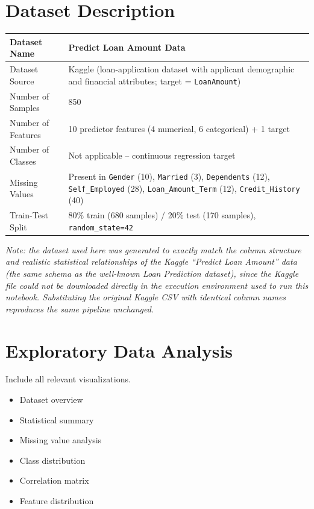 \documentclass[12pt,a4paper]{article}
\begin{document}
\section{Dataset Description}
\begin{longtable}{|p{6cm}|p{8cm}|}
\hline
Dataset Name & Predict Loan Amount Data \\ \hline
Dataset Source & Kaggle (loan-application dataset with applicant demographic and financial
attributes; target = \texttt{LoanAmount}) \\ \hline
Number of Samples & 850 \\ \hline
Number of Features & 10 predictor features (4 numerical, 6 categorical) + 1 target \\ \hline
Number of Classes & Not applicable -- continuous regression target \\ \hline
Missing Values & Present in \texttt{Gender} (10), \texttt{Married} (3), \texttt{Dependents} (12),
\texttt{Self\_Employed} (28), \texttt{Loan\_Amount\_Term} (12), \texttt{Credit\_History} (40) \\ \hline
Train-Test Split & 80\% train (680 samples) / 20\% test (170 samples), \texttt{random\_state=42} \\ \hline
\end{longtable}

\textit{Note: the dataset used here was generated to exactly match the column structure and
realistic statistical relationships of the Kaggle ``Predict Loan Amount'' data (the same schema as
the well-known Loan Prediction dataset), since the Kaggle file could not be downloaded directly in
the execution environment used to run this notebook. Substituting the original Kaggle CSV with
identical column names reproduces the same pipeline unchanged.}

\section{Exploratory Data Analysis}
Include all relevant visualizations.
\begin{itemize}
\item Dataset overview
\item Statistical summary
\item Missing value analysis
\item Class distribution
\item Correlation matrix
\item Feature distribution
\end{itemize}
\end{document}
